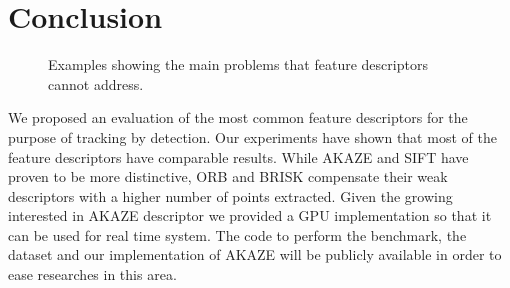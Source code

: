 \section{Conclusion}

\begin{figure}[t]
	\vspace{2mm}
\centerline{%
	}
	\vspace{-2mm}
\caption{Examples showing the main problems that feature descriptors cannot address. }
\label{fig:tracking_results_scale}
\end{figure} 



We proposed an evaluation of the most common feature descriptors for the purpose of tracking by detection. Our experiments have shown that most of the feature descriptors have comparable results. While AKAZE and SIFT have proven to be more distinctive, ORB and BRISK compensate their weak descriptors with a higher number of points extracted. Given the growing interested in AKAZE descriptor we provided a GPU implementation so that it can be used for real time system. The code to perform the benchmark, the dataset and our implementation of AKAZE will be publicly available in order to ease researches in this area.



